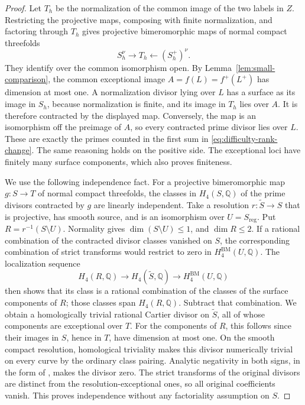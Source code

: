 \documentclass[11pt]{amsart}
\theoremstyle{definition}
\theoremstyle{remark}
\numberwithin{equation}{section}
\newcommand{\Q}{\mathbb{Q}}
\newcommand{\BM}{\mathrm{BM}}
\begin{document}
\begin{proof}
Let \(T_h\) be the normalization of the common image of the two labels in
\(Z\).  Restricting the projective maps, composing with finite
normalization, and factoring through \(T_h\) gives projective
bimeromorphic maps of normal compact threefolds
\[
 S_h^\nu\longrightarrow T_h\longleftarrow (S_h^+)^\nu.
\]
They identify over the common isomorphism open.  By
Lemma~\ref{lem:small-comparison}, the common exceptional image
\(A=f(L)=f^+(L^+)\) has dimension at most one.  A normalization divisor
lying over \(L\) has a surface as its image in \(S_h\), because
normalization is finite, and its image in \(T_h\) lies over \(A\).
It is therefore contracted by the displayed map.  Conversely, the map is
an isomorphism off the preimage of \(A\), so every contracted prime divisor
lies over \(L\).  These are exactly the primes counted in the first sum
in \eqref{eq:difficulty-rank-change}.  The same reasoning holds on the
positive side.  The exceptional loci have finitely many surface components,
which also proves finiteness.

We use the following independence fact.  For a projective bimeromorphic
map \(g:S\to T\) of normal compact threefolds, the classes in
\(H_4(S,\Q)\) of the prime divisors contracted by \(g\) are linearly
independent.  Take a resolution \(r:\widetilde S\to S\) that is projective,
has smooth source, and is an isomorphism over \(U=S_{\mathrm{reg}}\).  Put
\(R=r^{-1}(S\setminus U)\).  Normality gives \(\dim(S\setminus U)\leq1\),
and \(\dim R\leq2\).  If a rational combination of the contracted divisor
classes vanished on \(S\), the corresponding combination of strict
transforms would restrict to zero in \(H_4^{\BM}(U,\Q)\).  The localization
sequence
\[
 H_4(R,\Q)\longrightarrow H_4(\widetilde S,\Q)
                  \longrightarrow H_4^{\BM}(U,\Q)
\]
then shows that its class is a rational combination of the classes of the
surface components of \(R\); those classes span \(H_4(R,\Q)\).  Subtract
that combination.  We obtain a homologically trivial rational Cartier
divisor on \(\widetilde S\), all of whose components are exceptional over
\(T\).  For the components of \(R\), this follows since their images in
\(S\), hence in \(T\), have dimension at most one.  On the smooth compact
resolution, homological triviality makes this divisor numerically trivial
on every curve by the ordinary class pairing.  Analytic negativity in both
signs, in the form of \cite[Lemma~2.2]{CanonicalKahler}, makes the
divisor zero.  The strict transforms of the original divisors are distinct
from the resolution-exceptional ones, so all original coefficients vanish.
This proves independence without any factoriality assumption on \(S\).


\end{proof}
\end{document}
